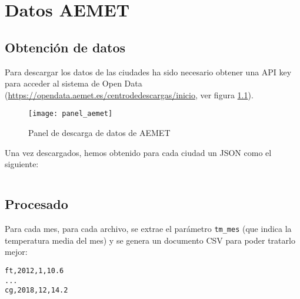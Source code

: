\chapter{Datos AEMET}
\label{appendix:datos_aemet}

\section{Obtención de datos}

Para descargar los datos de las ciudades ha sido necesario obtener una API key para acceder al sistema de Open Data (\url{https://opendata.aemet.es/centrodedescargas/inicio}, ver figura \ref{fig:panel_aemet}).

\begin{figure}[h]
  \caption{Panel de descarga de datos de AEMET}
  \label{fig:panel_aemet}
  \texttt{[image: panel\_aemet]}
\end{figure}

Una vez descargados, hemos obtenido para cada ciudad un JSON como el siguiente:

\inputminted{json}{apendices/datos_aemet.json}

\section{Procesado}

Para cada mes, para cada archivo, se extrae el parámetro \verb|tm_mes| (que indica la temperatura media del mes) y se genera un documento CSV para poder tratarlo mejor:

\begin{lstlisting}
ft,2012,1,10.6
...
cg,2018,12,14.2
\end{lstlisting}